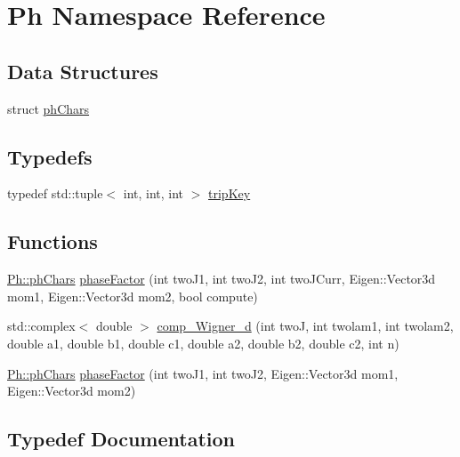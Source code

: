 \hypertarget{namespacePh}{}\section{Ph Namespace Reference}
\label{namespacePh}
\subsection*{Data Structures}
\begin{DoxyCompactItemize}
\item 
struct \mbox{\hyperlink{structPh_1_1phChars}{ph\+Chars}}
\end{DoxyCompactItemize}
\subsection*{Typedefs}
\begin{DoxyCompactItemize}
\item 
typedef std\+::tuple$<$ int, int, int $>$ \mbox{\hyperlink{namespacePh_afdd5bf3d7b37625115089ea3048e0cbb}{trip\+Key}}
\end{DoxyCompactItemize}
\subsection*{Functions}
\begin{DoxyCompactItemize}
\item 
\mbox{\hyperlink{structPh_1_1phChars}{Ph\+::ph\+Chars}} \mbox{\hyperlink{namespacePh_ad2fd8f885053b0833441c8388a9218b8}{phase\+Factor}} (int two\+J1, int two\+J2, int two\+J\+Curr, Eigen\+::\+Vector3d mom1, Eigen\+::\+Vector3d mom2, bool compute)
\item 
std\+::complex$<$ double $>$ \mbox{\hyperlink{namespacePh_a47fd4e2846a9ce86464940bc5f4cccf8}{comp\+\_\+\+Wigner\+\_\+d}} (int twoJ, int twolam1, int twolam2, double a1, double b1, double c1, double a2, double b2, double c2, int n)
\item 
\mbox{\hyperlink{structPh_1_1phChars}{Ph\+::ph\+Chars}} \mbox{\hyperlink{namespacePh_a51140cf285f02c028134a1e40807b54b}{phase\+Factor}} (int two\+J1, int two\+J2, Eigen\+::\+Vector3d mom1, Eigen\+::\+Vector3d mom2)
\end{DoxyCompactItemize}


\subsection{Typedef Documentation}
\mbox{\label{namespacePh_afdd5bf3d7b37625115089ea3048e0cbb}} 
